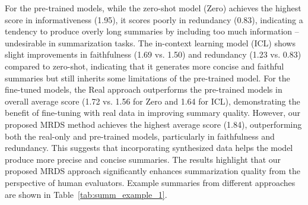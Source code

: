 For the pre-trained models, while the zero-shot model (Zero) achieves the highest score in informativeness (1.95), it scores poorly in redundancy (0.83), indicating a tendency to produce overly long summaries by including too much information --undesirable in summarization tasks. 
The in-context learning model (ICL) shows slight improvements in faithfulness (1.69 vs. 1.50) and redundancy (1.23 vs. 0.83) compared to zero-shot, indicating that it generates more concise and faithful summaries but still inherits some limitations of the pre-trained model.
For the fine-tuned models, the Real approach outperforms the pre-trained models in overall average score (1.72 vs. 1.56 for Zero and 1.64 for ICL), demonstrating the benefit of fine-tuning with real data in improving summary quality.
However, our proposed MRDS method achieves the highest average score (1.84), outperforming both the real-only and pre-trained models, particularly in faithfulness and redundancy. 
This suggests that incorporating synthesized data helps the model produce more precise and concise summaries. The results highlight that our proposed MRDS approach significantly enhances summarization quality from the perspective of human evaluators. Example summaries from different approaches are shown in Table~\ref{tab:summ_example_1}.


